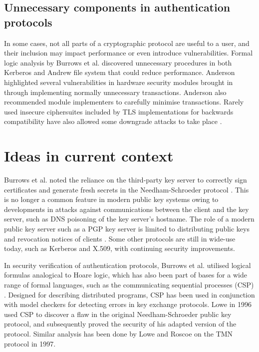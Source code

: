 \documentclass[11pt]{article}
\begin{document}
\subsection{Unnecessary components in authentication protocols}
In some cases, not all parts of a cryptographic protocol are useful to a user, and their inclusion may impact performance or even introduce vulnerabilities. Formal logic analysis by Burrows et al. \cite[4.1, 5.1]{burrows1989logic} discovered unnecessary procedures in both Kerberos and Andrew file system that could reduce performance. Anderson \cite{anderson2010security} highlighted several vulnerabilities in hardware security modules brought in through implementing normally unnecessary transactions. Anderson also recommended module implementers to carefully minimise transactions. Rarely used insecure ciphersuites included by TLS implementations for backwards compatibility have also allowed some downgrade attacks to take place \cite[V-D]{beurdouche2015messy}.

\section{Ideas in current context}

Burrows et al. \cite[6.1]{burrows1989logic} noted the reliance on the third-party key server to correctly sign certificates and generate fresh secrets in the Needham-Schroeder protocol \cite{needham1978using}. This is no longer a common feature in modern public key systems owing to developments in attacks against communications between the client and the key server, such as DNS poisoning of the key server's hostname. The role of a modern public key server such as a PGP key server is limited to distributing public keys and revocation notices of clients \cite[4.3]{whitten1999johnny}. Some other protocols are still in wide-use today, such as Kerberos and X.509, with continuing security improvements.

In security verification of authentication protocols, Burrows et al. \cite[2.5]{burrows1989logic} utilised logical formulas analogical to Hoare logic, which has also been part of bases for a wide range of formal languages, such as the communicating sequential processes (CSP) \cite{lamport1984hoare}. Designed for describing distributed programs, CSP has been used in conjunction with model checkers for detecting errors in key exchange protocols. Lowe  \cite{lowe1996breaking} in 1996 used CSP to discover a flaw in the original Needham-Schroeder public key protocol, and subsequently proved the security of his adapted version of the protocol. Similar analysis has been done by Lowe and Roscoe \cite{lowe1997using} on the TMN protocol in 1997. 
\end{document}
